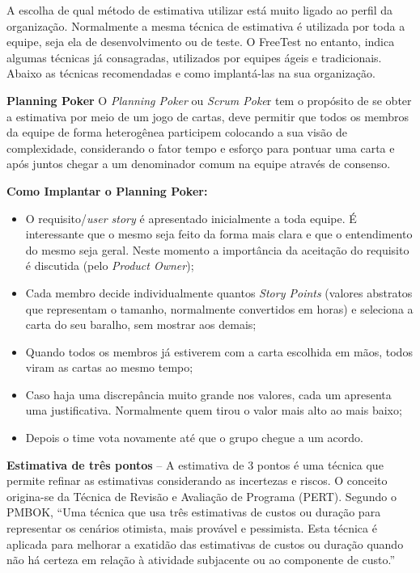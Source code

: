 A escolha de qual método de estimativa utilizar está muito ligado ao perfil da organização. Normalmente a mesma técnica de estimativa é utilizada por toda a equipe, seja ela de desenvolvimento ou de teste. O FreeTest no entanto, indica algumas técnicas já consagradas, utilizados por equipes ágeis e tradicionais. Abaixo as técnicas recomendadas e como implantá-las na sua organização.

\textbf{Planning Poker}\cite{Cohn2005} O \textit{Planning Poker} ou \textit{Scrum Poke}r tem o propósito de se obter a estimativa por meio de um jogo de cartas, deve permitir que todos os membros da equipe de forma heterogênea participem colocando a sua visão de complexidade, considerando o fator tempo e esforço para pontuar uma carta e após juntos chegar a um denominador comum na equipe através de consenso.

\textbf{Como Implantar o Planning Poker:}
\begin{itemize}
    \item O requisito/\textit{user story} é apresentado inicialmente a toda equipe. É interessante que o mesmo seja feito da forma mais clara e que o entendimento do mesmo seja geral. Neste momento a importância da aceitação do requisito é discutida (pelo \textit{Product Owner});
    \item Cada membro decide individualmente quantos \textit{Story Points} (valores abstratos que representam o tamanho, normalmente convertidos em horas) e seleciona a carta do seu baralho, sem mostrar aos demais;
    \item Quando todos os membros já estiverem com a carta escolhida em mãos, todos viram as cartas ao mesmo tempo;
    \item Caso haja uma discrepância muito grande nos valores, cada um apresenta uma justificativa. Normalmente quem tirou o valor mais alto ao mais baixo;
    \item Depois o time vota novamente até que o grupo chegue a um acordo.
\end{itemize}

\textbf{Estimativa de três pontos} – A estimativa de 3 pontos é uma técnica que permite refinar as estimativas considerando as incertezas e riscos. O conceito origina-se da Técnica de Revisão e Avaliação de Programa (PERT). Segundo o PMBOK, “Uma técnica que usa três estimativas de custos ou duração para representar os cenários otimista, mais provável e pessimista. Esta técnica é aplicada para melhorar a exatidão das estimativas de custos ou duração quando não há certeza em relação à atividade subjacente ou ao componente de custo.”

